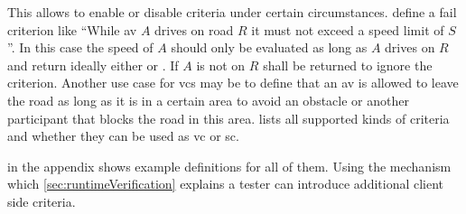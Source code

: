 This allows to enable or disable criteria under certain circumstances.
\Eg{} define a fail criterion like \enquote{While \gls{av} \(A\) drives on road \(R\) it must not exceed a speed limit of \(S\)}.
In this case the speed of \(A\) should only be evaluated as long as \(A\) drives on \(R\) and return ideally either \iltrue{} or \ilfalse{}.
If \(A\) is not on \(R\) \ilunknown{} shall be returned to ignore the criterion.
Another use case for \glspl{vc} may be to define that an \gls{av} is allowed to leave the road as long as it is in a certain area \eg{} to avoid an obstacle or another participant that blocks the road in this area.
 lists all supported kinds of criteria and whether they can be used as \gls{vc} or \gls{sc}.
\begin{table}
    \centering
    \caption{%
        Test criteria --- Lists all supported test criteria, describes their purpose and characterizes whether these can be used for \glspl{vc} or \glspl{sc}.
    }\label{tab:criteriaTypes}
    \medskip
    
\end{table}
 in the appendix shows example definitions for all of them.
Using the mechanism which \cref{sec:runtimeVerification} explains a tester can introduce additional client side criteria.
